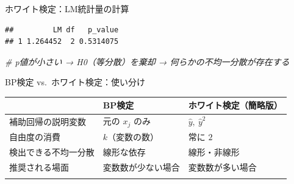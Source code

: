 \documentclass[
  ignorenonframetext,
]{beamer}
\newenvironment{Shaded}{\begin{snugshade}}{\end{snugshade}}
\newcommand{\AttributeTok}[1]{\textcolor[rgb]{0.13,0.29,0.53}{#1}}
\newcommand{\CommentTok}[1]{\textcolor[rgb]{0.56,0.35,0.01}{\textit{#1}}}
\newcommand{\DecValTok}[1]{\textcolor[rgb]{0.00,0.00,0.81}{#1}}
\newcommand{\FunctionTok}[1]{\textcolor[rgb]{0.13,0.29,0.53}{\textbf{#1}}}
\newcommand{\NormalTok}[1]{#1}
\newcommand{\OtherTok}[1]{\textcolor[rgb]{0.56,0.35,0.01}{#1}}
\newcommand{\SpecialCharTok}[1]{\textcolor[rgb]{0.81,0.36,0.00}{\textbf{#1}}}
\begin{document}
\begin{frame}[fragile]{ホワイト検定：LM統計量の計算}
\label{ux30dbux30efux30a4ux30c8ux691cux5b9almux7d71ux8a08ux91cfux306eux8a08ux7b97}
\footnotesize

\begin{Shaded}
\end{Shaded}

\begin{verbatim}
##         LM df   p_value
## 1 1.264452  2 0.5314075
\end{verbatim}

\begin{Shaded}
\begin{Highlighting}[]
\CommentTok{\# p値が小さい → H0（等分散）を棄却 → 何らかの不均一分散が存在する}
\end{Highlighting}
\end{Shaded}

\normalsize
\end{frame}

\begin{frame}{BP検定 vs.~ホワイト検定：使い分け}
\label{bpux691cux5b9a-vs.-ux30dbux30efux30a4ux30c8ux691cux5b9aux4f7fux3044ux5206ux3051}
\begin{longtable}[]{@{}lll@{}}
\toprule\noalign{}
& BP検定 & ホワイト検定（簡略版） \\
\midrule\noalign{}
\endhead
補助回帰の説明変数 & 元の \(x_j\) のみ & \(\hat{y},\ \hat{y}^2\) \\
自由度の消費 & \(k\)（変数の数） & 常に \(2\) \\
検出できる不均一分散 & 線形な依存 & 線形・非線形 \\
推奨される場面 & 変数数が少ない場合 & 変数数が多い場合 \\
\bottomrule\noalign{}
\end{longtable}
\end{frame}
\end{document}

